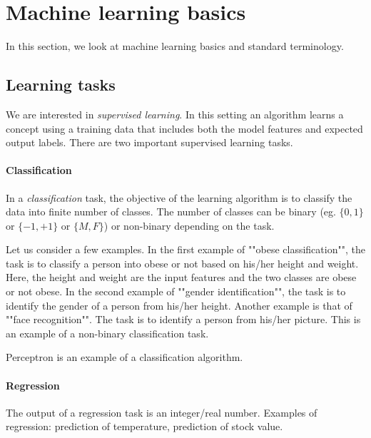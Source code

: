 \newcommand{\trans}[1]{{#1}^{T}}

\section{Machine learning basics}
In this section, we look at machine learning basics and standard terminology.

\subsection{Learning tasks}
We are interested in \emph{supervised learning}. In this setting an algorithm learns a concept using a training data that includes both the model features and expected output labels. There are two important supervised learning tasks.

\paragraph{Classification}
In a \emph{classification} task, the objective of the learning algorithm is to classify the data into finite number of classes. The number of classes can be binary (eg. $\{0,1\}$ or $\{-1,+1\}$ or $\{M, F\}$) or non-binary depending on the task. 

Let us consider a few examples. In the first example of ""obese classification"", the task is to classify a person into obese or not based on his/her height and weight. Here, the height and weight are the input features and the two classes are obese or not obese. In the second example of ""gender identification"", the task is to identify the gender of a person from his/her height. Another example is that of ""face recognition"". The task is to identify a person from his/her picture. This is an example of a non-binary classification task.

Perceptron is an example of a classification algorithm. 

\paragraph{Regression} %
The output of a regression task is an integer/real number. Examples of regression: prediction of temperature, prediction of stock value.


